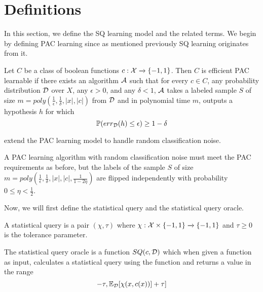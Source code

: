 \section{Definitions}
\label{sec:definitions}
In this section, we define the SQ learning model and the related terms. We begin by defining PAC learning since as mentioned previously SQ learning originates from it.

\begin{definition}
Let $C$ be a class of boolean functions $c: \mathcal{X} \xrightarrow{} \{-1, 1\}$. Then $C$ is efficient PAC learnable if there exists an algorithm $\mathcal{A}$ such that for every $c \in C$, any probability distribution $\mathcal{D}$ over $X$, any $\epsilon > 0$, and any $\delta < 1$, $\mathcal{A}$ takes a labeled sample $S$ of size $m = poly\left(\frac{1}{\epsilon}, \frac{1}{\delta}, |x|, |c|\right)$ from $\mathcal{D}$ and in polynomial time $m$, outputs a hypothesis $h$ for which
    \begin{equation*}
        \mathbb{P}( err_{\mathcal{D}}(h) \leq \epsilon ) \geq 1 - \delta
    \end{equation*}
\end{definition}

\cite{angluin_learning_1988} extend the PAC learning model to handle random classification noise.

\begin{definition}
A PAC learning algorithm with random classification noise must meet the PAC requirements as before, but the labels of the sample $S$ of size $m = poly\left(\frac{1}{\epsilon}, \frac{1}{\delta}, |x|, |c|, \frac{1}{1-2\eta}\right)$ are flipped independently with probability $0 \leq \eta < \frac{1}{2}$.
\end{definition}

Now, we will first define the statistical query and the statistical query oracle.

\begin{definition}
A statistical query is a pair $(\chi, \tau)$ where $\chi: \mathcal{X} \times \{-1, 1\} \xrightarrow{} \{-1, 1\}$ and $\tau \geq 0$ is the tolerance parameter.
\end{definition}

\begin{definition}
The statistical query oracle is a function $SQ(c, \mathcal{D})$ which when given a function as input, calculates a statistical query using the function and returns a value in the range
\begin{equation*}
    [\mathbb{E}_{\cD}[\chi(x, c(x))] - \tau, \mathbb{E}_{\cD}[\chi(x, c(x))] + \tau]
\end{equation*}
\end{definition}

